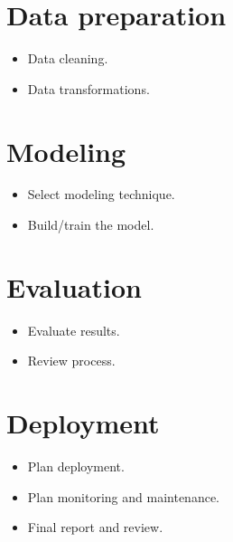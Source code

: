 \section{Data preparation}
\begin{itemize}
    \item Data cleaning.
    \item Data transformations.
\end{itemize}

\section{Modeling}
\begin{itemize}
    \item Select modeling technique.
    \item Build/train the model.
\end{itemize}

\section{Evaluation}
\begin{itemize}
    \item Evaluate results.
    \item Review process.
\end{itemize}

\section{Deployment}
\begin{itemize}
    \item Plan deployment.
    \item Plan monitoring and maintenance.
    \item Final report and review.
\end{itemize}
